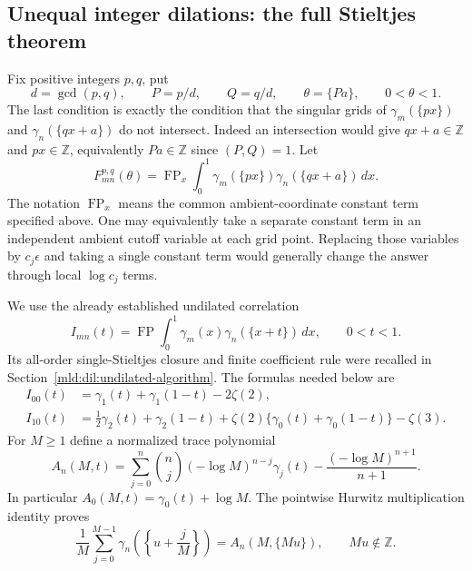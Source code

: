 \subsection{Unequal integer dilations: the full Stieltjes theorem}
Fix positive integers $p,q$, put
\begin{equation}
 d=\gcd(p,q),\qquad P=p/d,\qquad Q=q/d,\qquad
 \theta=\{Pa\},\qquad 0<\theta<1.
 \label{mld:dil:parameters}
\end{equation}
The last condition is exactly the condition that the singular grids of
$\gamma_m(\{px\})$ and $\gamma_n(\{qx+a\})$ do not intersect.
Indeed an intersection would give $qx+a\in\mathbb Z$ and
$px\in\mathbb Z$, equivalently $Pa\in\mathbb Z$ since $(P,Q)=1$.
Let
\[
 F_{mn}^{p,q}(\theta)
 =\operatorname{FP}_x\int_0^1
       \gamma_m(\{px\})\gamma_n(\{qx+a\})\,dx.
\]
The notation $\operatorname{FP}_x$ means the common ambient-coordinate
constant term specified above. One may equivalently take a separate
constant term in an independent ambient cutoff variable at each grid
point. Replacing those variables by $c_j\epsilon$ and taking a single
constant term would generally change the answer through local
$\log c_j$ terms.

We use the already established undilated correlation
\[
 I_{mn}(t)=\operatorname{FP}\int_0^1
                  \gamma_m(x)\gamma_n(\{x+t\})\,dx,
 \qquad 0<t<1.
\]
Its all-order single-Stieltjes closure and finite coefficient rule were
recalled in Section~\ref{mld:dil:undilated-algorithm}.  The formulas needed below are
\begin{align}
 I_{00}(t)&=\gamma_1(t)+\gamma_1(1-t)-2\zeta(2),
 \label{mld:dil:I00}\\
 I_{10}(t)&=\tfrac12\gamma_2(t)+\gamma_2(1-t)
        +\zeta(2)\{\gamma_0(t)+\gamma_0(1-t)\}-\zeta(3).
 \label{mld:dil:I10}
\end{align}
For $M\ge1$ define a normalized trace polynomial
\begin{equation}
 A_n(M,t)=\sum_{j=0}^n\binom nj(-\log M)^{n-j}\gamma_j(t)
                 -\frac{(-\log M)^{n+1}}{n+1}.
 \label{mld:dil:trace-polynomial}
\end{equation}
In particular $A_0(M,t)=\gamma_0(t)+\log M$.
The pointwise Hurwitz multiplication identity \cite[\S25.11]{DLMFhurwitz} proves
\[
 \frac1M\sum_{j=0}^{M-1}\gamma_n\!\left(\left\{u+\frac jM\right\}\right)
                     =A_n(M,\{Mu\}),\qquad Mu\notin\mathbb Z.
\]

